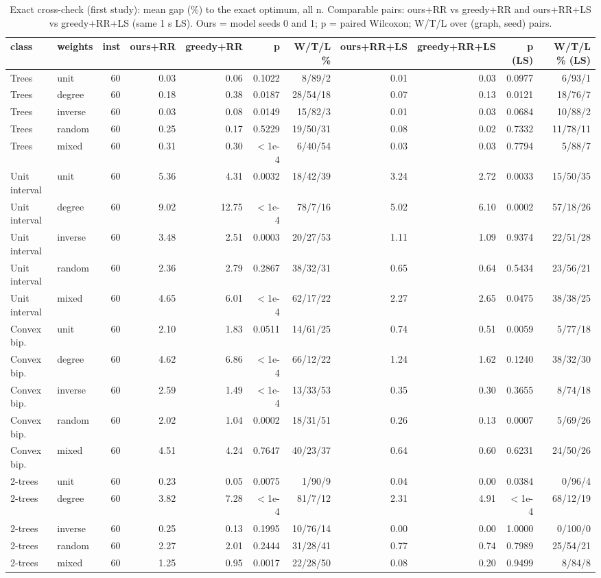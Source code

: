 \begin{table}[t]
\centering
\caption{Exact cross-check (first study): mean gap (\%) to the exact optimum, all n. Comparable pairs: ours+RR vs greedy+RR and ours+RR+LS vs greedy+RR+LS (same 1 s LS). Ours = model seeds 0 and 1; p = paired Wilcoxon; W/T/L over (graph, seed) pairs.}
\label{tab:exact_fair_first}
\scriptsize
\begin{tabular}{llrrrrrrrrr}
\toprule
class & weights & inst & ours+RR & greedy+RR & p & W/T/L \% & ours+RR+LS & greedy+RR+LS & p (LS) & W/T/L \% (LS) \\
\midrule
Trees & unit & 60 & 0.03 & 0.06 & 0.1022 & 8/89/2 & 0.01 & 0.03 & 0.0977 & 6/93/1 \\
Trees & degree & 60 & 0.18 & 0.38 & 0.0187 & 28/54/18 & 0.07 & 0.13 & 0.0121 & 18/76/7 \\
Trees & inverse & 60 & 0.03 & 0.08 & 0.0149 & 15/82/3 & 0.01 & 0.03 & 0.0684 & 10/88/2 \\
Trees & random & 60 & 0.25 & 0.17 & 0.5229 & 19/50/31 & 0.08 & 0.02 & 0.7332 & 11/78/11 \\
Trees & mixed & 60 & 0.31 & 0.30 & $<$1e-4 & 6/40/54 & 0.03 & 0.03 & 0.7794 & 5/88/7 \\
Unit interval & unit & 60 & 5.36 & 4.31 & 0.0032 & 18/42/39 & 3.24 & 2.72 & 0.0033 & 15/50/35 \\
Unit interval & degree & 60 & 9.02 & 12.75 & $<$1e-4 & 78/7/16 & 5.02 & 6.10 & 0.0002 & 57/18/26 \\
Unit interval & inverse & 60 & 3.48 & 2.51 & 0.0003 & 20/27/53 & 1.11 & 1.09 & 0.9374 & 22/51/28 \\
Unit interval & random & 60 & 2.36 & 2.79 & 0.2867 & 38/32/31 & 0.65 & 0.64 & 0.5434 & 23/56/21 \\
Unit interval & mixed & 60 & 4.65 & 6.01 & $<$1e-4 & 62/17/22 & 2.27 & 2.65 & 0.0475 & 38/38/25 \\
Convex bip. & unit & 60 & 2.10 & 1.83 & 0.0511 & 14/61/25 & 0.74 & 0.51 & 0.0059 & 5/77/18 \\
Convex bip. & degree & 60 & 4.62 & 6.86 & $<$1e-4 & 66/12/22 & 1.24 & 1.62 & 0.1240 & 38/32/30 \\
Convex bip. & inverse & 60 & 2.59 & 1.49 & $<$1e-4 & 13/33/53 & 0.35 & 0.30 & 0.3655 & 8/74/18 \\
Convex bip. & random & 60 & 2.02 & 1.04 & 0.0002 & 18/31/51 & 0.26 & 0.13 & 0.0007 & 5/69/26 \\
Convex bip. & mixed & 60 & 4.51 & 4.24 & 0.7647 & 40/23/37 & 0.64 & 0.60 & 0.6231 & 24/50/26 \\
2-trees & unit & 60 & 0.23 & 0.05 & 0.0075 & 1/90/9 & 0.04 & 0.00 & 0.0384 & 0/96/4 \\
2-trees & degree & 60 & 3.82 & 7.28 & $<$1e-4 & 81/7/12 & 2.31 & 4.91 & $<$1e-4 & 68/12/19 \\
2-trees & inverse & 60 & 0.25 & 0.13 & 0.1995 & 10/76/14 & 0.00 & 0.00 & 1.0000 & 0/100/0 \\
2-trees & random & 60 & 2.27 & 2.01 & 0.2444 & 31/28/41 & 0.77 & 0.74 & 0.7989 & 25/54/21 \\
2-trees & mixed & 60 & 1.25 & 0.95 & 0.0017 & 22/28/50 & 0.08 & 0.20 & 0.9499 & 8/84/8 \\
\bottomrule
\end{tabular}
\end{table}
